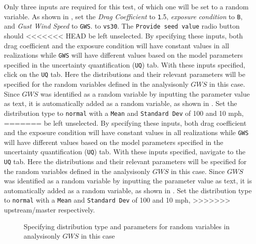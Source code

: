 Only three inputs are required for this test, of which one will be set
to a random variable. As shown in , set the
\emph{Drag Coefficient} to {\texttt 1.5}, \emph{exposure condition} to \texttt{B}, and \emph{Gust Wind Speed} to \texttt{GWS}.
to \texttt{vs30}. The \texttt{Provide seed value} radio button should
<<<<<<< HEAD
be left unselected. By specifying these inputs, both drag coefficient and the
exposure condition will have constant values in all realizations while \texttt{GWS} will have different values based on the model parameters specified in the
uncertainty quantification (\texttt{UQ}) tab. With these inputs specified, click on the \texttt{UQ} tab. Here the distributions and their relevant parameters will be specified for the random variables defined in the analysis\textemdash only $GWS$
in this case. Since $GWS$ was identified as a random variable
by inputting the parameter value as text, it is automatically added as
a random variable, as shown in . Set the
distribution type to \texttt{normal} with a \texttt{Mean}
and \texttt{Standard Dev} of 100 and 10 mph,
=======
be left unselected. By specifying these inputs, both drag coefficient
and the exposure condition will have constant values in all
realizations while \texttt{GWS} will have different values based on
the model parameters specified in the uncertainty quantification
(\texttt{UQ}) tab. With these inputs specified, navigate to
the \texttt{UQ} tab. Here the distributions and their relevant
parameters will be specified for the random variables defined in the
analysis\textemdash only $GWS$ in this case. Since $GWS$ was
identified as a random variable by inputting the parameter value as
text, it is automatically added as a random variable, as shown
in . Set the distribution type to \texttt{normal}
with a \texttt{Mean} and \texttt{Standard Dev} of 100 and 10 mph,
>>>>>>> upstream/master
respectively.

\begin{figure}[!htbp]
  \caption{Specifying distribution type and parameters for random
  variables in analysis\textemdash only $GWS$ in this case}
  \label{fig:input_uq}
\end{figure}

